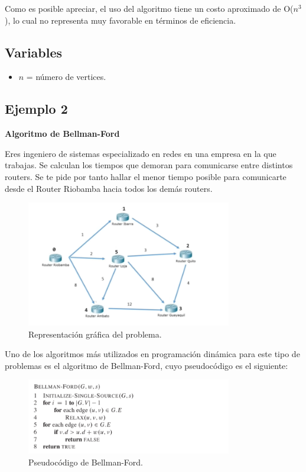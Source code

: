 Como es posible apreciar, el uso del algoritmo tiene un costo aproximado de O($n^3$), lo cual no representa muy favorable en términos de eficiencia.

\subsection*{Variables}

\begin{itemize}
    \item \( n \) = número de vertices.
\end{itemize}

\subsection{Ejemplo 2}
\textbf{Algoritmo de Bellman-Ford}

Eres ingeniero de sistemas especializado en redes en una empresa en la que trabajas. Se calculan los tiempos que demoran para comunicarse entre distintos routers. Se te pide por tanto hallar el menor tiempo posible para comunicarte desde el Router Riobamba hacia todos los demás routers. 

\begin{figure}[H]
	\centering
	\includegraphics[width=0.8\textwidth]{bellman-fordejemplo.png}
	\caption{Representación gráfica del problema.}
	\label{fig:resultado4}
\end{figure}


Uno de los algoritmos más utilizados en programación dinámica para este tipo de problemas es el algoritmo de Bellman-Ford, cuyo pseudocódigo es el siguiente:

\begin{figure}[H]
	\centering
	\includegraphics[width=0.8\textwidth]{distancias_cortas_Pseudo2.png}
	\caption{Pseudocódigo de Bellman-Ford.}
	\label{fig:resultado5}
\end{figure}

